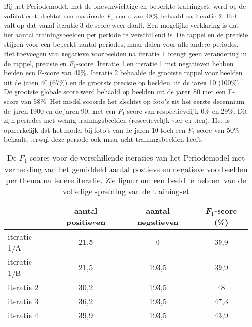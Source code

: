 Bij het Periodemodel, met de onevenwichtige en beperkte trainingset, werd op de validatieset slechtst een maximale \textit{F$_{1}$}-score van 48\% behaald na iteratie 2. Het valt op dat vanaf iteratie 3 de score weer daalt. Een mogelijke verklaring is dat het aantal trainingsbeelden per periode te verschillend is. De rappel en de precisie stijgen voor een beperkt aantal periodes, maar dalen voor alle andere periodes. Het toevoegen van negatieve voorbeelden na iteratie 1 brengt geen verandering in de rappel, precisie en \textit{F$_{1}$}-score. Iteratie 1 en iteratie 1 met negatieven hebben beiden een F-score van 40\%. Iteratie 2 behaalde de grootste rappel voor beelden uit de jaren 40 (67\%) en de grootste precisie op beelden uit de jaren 10 (100\%). De grootste globale score werd behaald op beelden uit de jaren 80 met een F-score van 58\%. Het model scoorde het slechtst op foto’s uit het eerste decennium de jaren 1900 en de jaren 90, met een \textit{F$_{1}$}-score van respectievelijk 0\% en 29\%. Dit zijn periodes met weinig trainingsbeelden (resectievelijk vier en tien). Het is opmerkelijk dat het model bij foto's van de jaren 10 toch een \textit{F$_{1}$}-score van 50\% behaalt, terwijl deze periode ook maar acht trainingsbeelden heeft.

\begin{table}
	\centering
	\renewcommand\arraystretch{1.2}
	\begin{tabular}{l|cc|c}
		\toprule
		& aantal positieven  &  aantal negatieven &  \textit{F$_{1}$}-score (\%)\\
		\midrule
		iteratie 1/A & 21,5 & 0 & 39,9 \\
		iteratie 1/B & 21,5 & 193,5 & 39,9 \\
		iteratie 2 & 30,2 & 193,5 & 48 \\
		iteratie 3 & 36,2 & 193,5 & 47,3 \\
		iteratie 4 & 39,9 & 193,5 & 43,9 \\
		\bottomrule
	\end{tabular}
	\caption[De \textit{F$_{1}$}-scores voor de verschillende iteraties van het Periodemodel.]{De \textit{F$_{1}$}-scores voor de verschillende iteraties van het Periodemodel met vermelding van het gemiddeld aantal postieve en negatieve voorbeelden per thema na iedere iteratie. Zie figuur om een beeld te hebben van de volledige spreiding van de trainingset}
	\label{tab:validatie-periodemodel}
\end{table}

